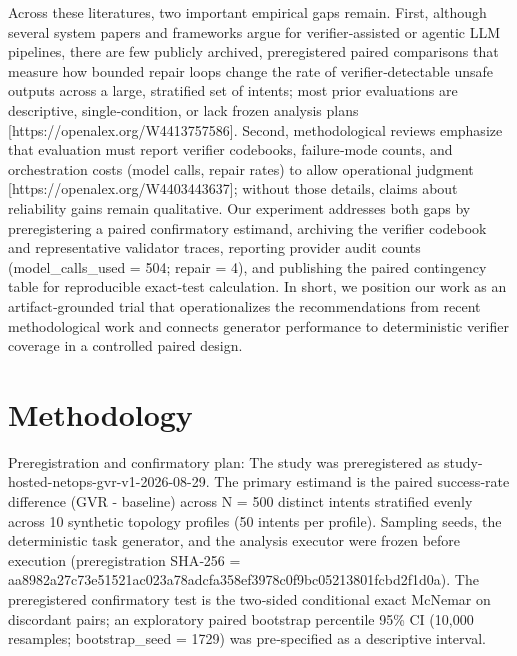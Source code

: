 \documentclass[conference]{IEEEtran}
\begin{document}
Across these literatures, two important empirical gaps remain. First, although several system papers and frameworks argue for verifier‑assisted or agentic LLM pipelines, there are few publicly archived, preregistered paired comparisons that measure how bounded repair loops change the rate of verifier‑detectable unsafe outputs across a large, stratified set of intents; most prior evaluations are descriptive, single‑condition, or lack frozen analysis plans [https://openalex.org/W4413757586]. Second, methodological reviews emphasize that evaluation must report verifier codebooks, failure‑mode counts, and orchestration costs (model calls, repair rates) to allow operational judgment [https://openalex.org/W4403443637]; without those details, claims about reliability gains remain qualitative. Our experiment addresses both gaps by preregistering a paired confirmatory estimand, archiving the verifier codebook and representative validator traces, reporting provider audit counts (model\_calls\_used = 504; repair = 4), and publishing the paired contingency table for reproducible exact‑test calculation. In short, we position our work as an artifact‑grounded trial that operationalizes the recommendations from recent methodological work and connects generator performance to deterministic verifier coverage in a controlled paired design.

\section{Methodology}
Preregistration and confirmatory plan: The study was preregistered as study-hosted-netops-gvr-v1-2026-08-29. The primary estimand is the paired success‑rate difference (GVR - baseline) across N = 500 distinct intents stratified evenly across 10 synthetic topology profiles (50 intents per profile). Sampling seeds, the deterministic task generator, and the analysis executor were frozen before execution (preregistration SHA‑256 = aa8982a2\allowbreak{}7c73e515\allowbreak{}21ac023a\allowbreak{}78adcfa3\allowbreak{}58ef3978\allowbreak{}c0f9bc05\allowbreak{}213801fc\allowbreak{}bd2f1d0a). The preregistered confirmatory test is the two‑sided conditional exact McNemar on discordant pairs; an exploratory paired bootstrap percentile 95\% CI (10,000 resamples; bootstrap\_seed = 1729) was pre‑specified as a descriptive interval.
\end{document}
